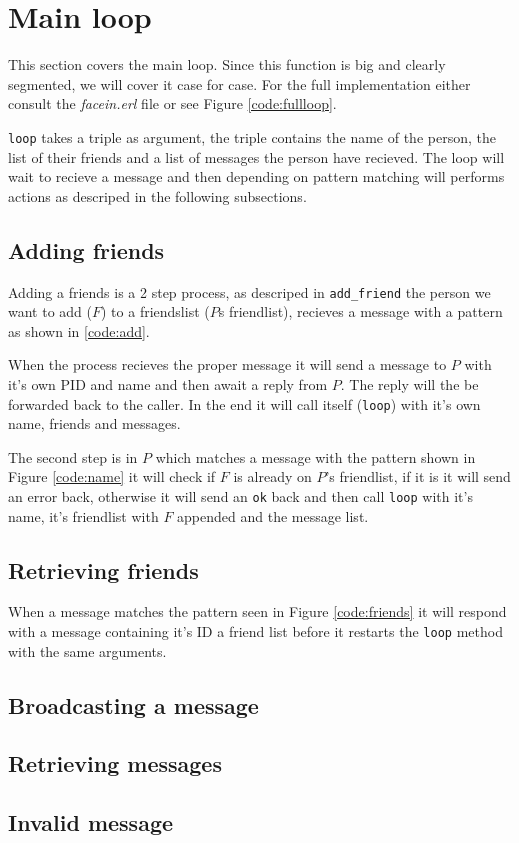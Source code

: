 \section{Main loop}
This section covers the main loop. Since this function is big and clearly
segmented, we will cover it case for case. For the full implementation either
consult the \textit{facein.erl} file or see Figure \ref{code:fullloop}.

\texttt{loop} takes a triple as argument, the triple contains the name of the
person, the list of their friends and a list of messages the person have
recieved. The loop will wait to recieve a message and then depending on pattern
matching will performs actions as descriped in the following subsections.

\subsection{Adding friends}
Adding a friends is a 2 step process, as descriped in \texttt{add\_friend} the
person we want to add ($F$) to a friendslist ($P$s friendlist), recieves a
message with a pattern as shown in \ref{code:add}.


When the process recieves the proper message it will send a message to $P$ with
it's own PID and name and then await a reply from $P$. The reply will the be
forwarded back to the caller. In the end it will call itself (\texttt{loop})
with it's own name, friends and messages.


The second step is in $P$ which matches a message with the pattern shown in
Figure \ref{code:name} it will check if $F$ is already on $P$'s friendlist, if
it is it will send an error back, otherwise it will send an \texttt{ok} back and
then call \texttt{loop} with it's name, it's friendlist with $F$ appended and
the message list.

\subsection{Retrieving friends}


When a message matches the pattern seen in Figure \ref{code:friends} it will
respond with a message containing it's ID a friend list before it restarts the
\texttt{loop} method with the same arguments.

\subsection{Broadcasting a message}
\subsection{Retrieving messages}
\subsection{Invalid message}